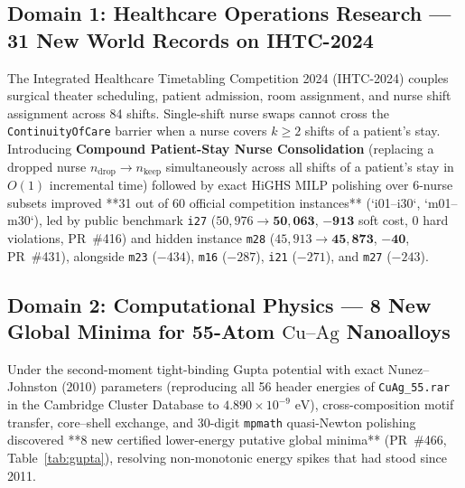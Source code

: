 \documentclass[11pt,a4paper]{article}
\begin{document}
\subsection{Domain 1: Healthcare Operations Research --- 31 New World Records on IHTC-2024}
The Integrated Healthcare Timetabling Competition 2024 (IHTC-2024) couples surgical theater scheduling, patient admission, room assignment, and nurse shift assignment across 84 shifts. Single-shift nurse swaps cannot cross the \texttt{ContinuityOfCare} barrier when a nurse covers $k \ge 2$ shifts of a patient's stay. Introducing \textbf{Compound Patient-Stay Nurse Consolidation} (replacing a dropped nurse $n_{\text{drop}} \to n_{\text{keep}}$ simultaneously across all shifts of a patient's stay in $O(1)$ incremental time) followed by exact HiGHS MILP polishing over 6-nurse subsets improved **31 out of 60 official competition instances** (`i01--i30`, `m01--m30`), led by public benchmark \texttt{i27} ($50{,}976 \to \mathbf{50{,}063}$, $\mathbf{-913}$ soft cost, $0$ hard violations, PR~\#416) and hidden instance \texttt{m28} ($45{,}913 \to \mathbf{45{,}873}$, $\mathbf{-40}$, PR~\#431), alongside \texttt{m23} ($-434$), \texttt{m16} ($-287$), \texttt{i21} ($-271$), and \texttt{m27} ($-243$).

\subsection{Domain 2: Computational Physics --- 8 New Global Minima for 55-Atom $\text{Cu--Ag}$ Nanoalloys}
Under the second-moment tight-binding Gupta potential with exact Nunez--Johnston (2010) parameters (reproducing all 56 header energies of \texttt{CuAg\_55.rar} in the Cambridge Cluster Database to $4.890 \times 10^{-9}\text{ eV}$), cross-composition motif transfer, core--shell exchange, and 30-digit \texttt{mpmath} quasi-Newton polishing discovered **8 new certified lower-energy putative global minima** (PR~\#466, Table~\ref{tab:gupta}), resolving non-monotonic energy spikes that had stood since 2011.
\end{document}
